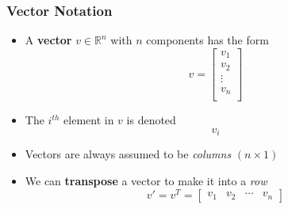 \documentclass[10pt]{beamer}
\begin{document}

\begin{frame}[fragile]
\frametitle{Vector Notation}
\begin{itemize}
    \item A \textbf{vector} $v \in \mathbb{R}^n$ with $n$ components has the form
\begin{equation*}
    v = \begin{bmatrix} v_{1}  \\
                        v_{2}  \\
                        \vdots  \\
                        v_{n}  \\
        \end{bmatrix}
\end{equation*}

\item The $i^{th}$ element in $v$ is denoted 
    $$v_i$$ 


\item Vectors are always assumed to be \textit{columns} $(n\times 1)$
\vfill
\item We can \textbf{transpose} a vector to make it into a \textit{row}
    $$ v' = v^T= \begin{bmatrix} v_{1} & v_{2} & \cdots & v_{n} \end{bmatrix}$$

\end{itemize}
\end{frame}
\end{document}
